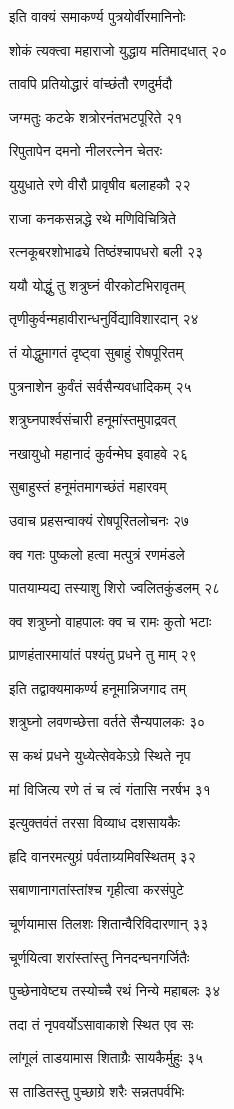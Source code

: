 इति वाक्यं समाकर्ण्य पुत्रयोर्वीरमानिनोः

शोकं त्यक्त्वा महाराजो युद्धाय मतिमादधात् २०

तावपि प्रतियोद्धारं वांच्छंतौ रणदुर्मदौ

जग्मतुः कटके शत्रोरनंतभटपूरिते २१

रिपुतापेन दमनो नीलरत्नेन चेतरः

युयुधाते रणे वीरौ प्रावृषीव बलाहकौ २२

राजा कनकसन्नद्धे रथे मणिविचित्रिते

रत्नकूबरशोभाढ्ये तिष्ठंश्चापधरो बली २३

ययौ योद्धुं तु शत्रुघ्नं वीरकोटभिरावृतम्

तृणीकुर्वन्महावीरान्धनुर्विद्याविशारदान् २४

तं योद्धुमागतं दृष्ट्वा सुबाहुं रोषपूरितम्

पुत्रनाशेन कुर्वंतं सर्वसैन्यवधादिकम् २५

शत्रुघ्नपार्श्वसंचारी हनूमांस्तमुपाद्रवत्

नखायुधो महानादं कुर्वन्मेघ इवाहवे २६

सुबाहुस्तं हनूमंतमागच्छंतं महारवम्

उवाच प्रहसन्वाक्यं रोषपूरितलोचनः २७

क्व गतः पुष्कलो हत्वा मत्पुत्रं रणमंडले

पातयाम्यद्य तस्याशु शिरो ज्वलितकुंडलम् २८

क्व शत्रुघ्नो वाहपालः क्व च रामः कुतो भटाः

प्राणहंतारमायांतं पश्यंतु प्रधने तु माम् २९

इति तद्वाक्यमाकर्ण्य हनूमान्निजगाद तम्

शत्रुघ्नो लवणच्छेत्ता वर्तते सैन्यपालकः ३०

स कथं प्रधने युध्येत्सेवकेऽग्रे स्थिते नृप

मां विजित्य रणे तं च त्वं गंतासि नरर्षभ ३१

इत्युक्तवंतं तरसा विव्याध दशसायकैः

हृदि वानरमत्युग्रं पर्वताग्र्यमिवस्थितम् ३२

सबाणानागतांस्तांश्च गृहीत्वा करसंपुटे

चूर्णयामास तिलशः शितान्वैरिविदारणान् ३३

चूर्णयित्वा शरांस्तांस्तु निनदन्घनगर्जितैः

पुच्छेनावेष्ट्य तस्योच्चै रथं निन्ये महाबलः ३४

तदा तं नृपवर्योऽसावाकाशे स्थित एव सः

लांगूलं ताडयामास शिताग्रैः सायकैर्मुहुः ३५

स ताडितस्तु पुच्छाग्रे शरैः सन्नतपर्वभिः

